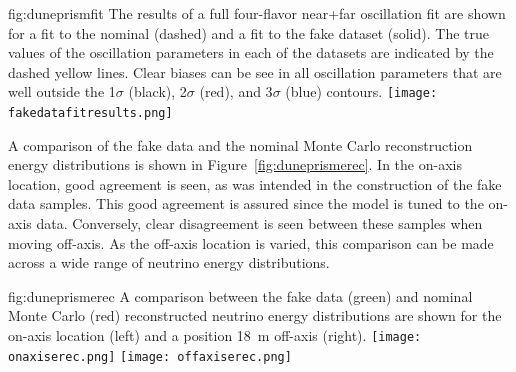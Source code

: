\begin{dunefigure}{fig:duneprismfit}
{The results of a full four-flavor near+far oscillation fit are shown for a fit to the nominal  (dashed) and a fit to the fake dataset (solid). The true values of the oscillation parameters in each of the datasets are indicated by the dashed yellow lines. Clear biases can be see in all oscillation parameters that are well outside the 1$\sigma$ (black), 2$\sigma$ (red), and 3$\sigma$ (blue) contours.}
      \texttt{[image: fakedatafitresults.png]}
\end{dunefigure}

A comparison of the fake data and the nominal Monte Carlo reconstruction energy distributions is shown in Figure~\ref{fig:duneprismerec}. In the on-axis location, good agreement is seen, as was intended in the construction of the fake data samples. This good agreement is assured since the model is tuned to the on-axis data.  Conversely, clear disagreement is seen between these samples when moving off-axis. As the off-axis location is varied, this comparison can be made across a wide range of neutrino energy distributions.

\begin{dunefigure}{fig:duneprismerec}
{A comparison between the fake data (green) and nominal Monte Carlo (red) reconstructed neutrino energy distributions are shown for the on-axis   location (left) and a position \SI{18}{m} off-axis (right).}
      \texttt{[image: onaxiserec.png]}
      \texttt{[image: offaxiserec.png]}
\end{dunefigure}

